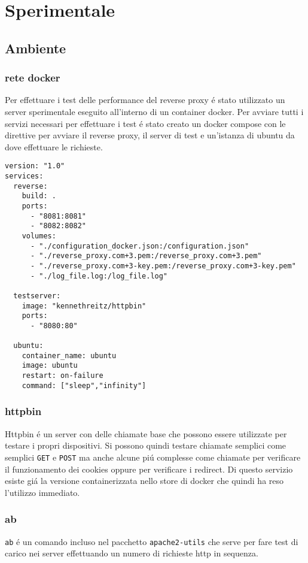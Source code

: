 \chapter{Sperimentale}
\label{cha:Sperimentale}

\section{Ambiente}
\subsection{rete docker}
Per effettuare i test delle performance del reverse proxy é stato utilizzato un server sperimentale eseguito all'interno di un container docker. Per avviare tutti i servizi necessari per effettuare i test é stato creato un docker compose con le direttive per avviare il reverse proxy, il server di test e un'istanza di ubuntu da dove effettuare le richieste.

\begin{lstlisting}[language=DockerCompose]
version: "1.0"
services:
  reverse:
    build: .
    ports:
      - "8081:8081"
      - "8082:8082"
    volumes:
      - "./configuration_docker.json:/configuration.json"
      - "./reverse_proxy.com+3.pem:/reverse_proxy.com+3.pem"
      - "./reverse_proxy.com+3-key.pem:/reverse_proxy.com+3-key.pem"
      - "./log_file.log:/log_file.log"

  testserver:
    image: "kennethreitz/httpbin"
    ports:
      - "8080:80"

  ubuntu:
    container_name: ubuntu
    image: ubuntu
    restart: on-failure
    command: ["sleep","infinity"]

\end{lstlisting}

\subsection{httpbin}
\cite{httpbin}
Httpbin é un server con delle chiamate base che possono essere utilizzate per testare i propri dispositivi. Si possono quindi testare chiamate semplici come semplici \texttt{GET} e \texttt{POST} ma anche alcune piú complesse come chiamate per verificare il funzionamento dei cookies oppure per verificare i redirect. Di questo servizio esiste giá la versione containerizzata nello store di docker che quindi ha reso l'utilizzo immediato.

\subsection{ab}
\cite{ab}
\texttt{ab} é un comando incluso nel pacchetto \texttt{apache2-utils} che serve per fare test di carico nei server effettuando un numero di richieste http in sequenza.

